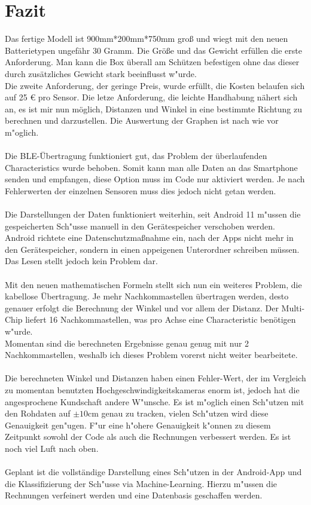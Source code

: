 \chapter{Fazit}
Das fertige Modell ist 900mm*200mm*750mm groß und wiegt mit den 
neuen Batterietypen ungefähr 30 Gramm. Die Größe und das Gewicht 
erfüllen die erste Anforderung. Man kann die Box überall am 
Schützen befestigen ohne das dieser durch zusätzliches Gewicht 
stark beeinflusst w"urde.\\
Die zweite Anforderung, der geringe Preis, wurde erfüllt, die
Kosten belaufen sich auf 25 \euro{} pro Sensor. Die letze Anforderung,
die leichte Handhabung nähert sich an, es ist mir nun möglich, Distanzen
und Winkel in eine bestimmte Richtung zu berechnen und darzustellen.
Die Auswertung der Graphen ist nach wie vor m"oglich.\\
\\
Die BLE-Übertragung funktioniert gut, das Problem der überlaufenden
Characteristics wurde behoben. Somit kann man alle Daten an das 
Smartphone senden und empfangen, diese Option muss im Code nur 
aktiviert werden. Je nach Fehlerwerten der einzelnen Sensoren muss dies 
jedoch nicht getan werden.\\
\\
Die Darstellungen der Daten funktioniert weiterhin, seit Android 11
m"ussen die gespeicherten Sch"usse manuell in den Gerätespeicher 
verschoben werden. Android richtete eine Datenschutzmaßnahme ein, 
nach der Apps nicht mehr in den Gerätespeicher, sondern in einen
appeigenen Unterordner schreiben müssen. Das Lesen stellt jedoch
kein Problem dar.\\
\\
Mit den neuen mathematischen Formeln stellt sich nun ein weiteres
Problem, die kabellose Übertragung. Je mehr Nachkommastellen übertragen
werden, desto genauer erfolgt die Berechnung der Winkel und vor allem 
der Distanz. Der Multi-Chip liefert 16 Nachkommastellen, was pro Achse
eine Characteristic benötigen w"urde.\\
Momentan sind die berechneten Ergebnisse genau genug mit nur 2 
Nachkommastellen, weshalb ich dieses Problem vorerst nicht weiter bearbeitete.\\
\\
Die berechneten Winkel und Distanzen haben einen Fehler-Wert, der im Vergleich
zu momentan benutzten Hochgeschwindigkeitskameras enorm ist, jedoch 
hat die angesprochene Kundschaft andere W"unsche. Es ist m"oglich 
einen Sch"utzen mit den Rohdaten auf $\pm10$cm genau zu tracken, vielen
Sch"utzen wird diese Genauigkeit gen"ugen. F"ur eine h"ohere Genauigkeit 
k"onnen zu diesem Zeitpunkt sowohl der Code als auch die Rechnungen verbessert 
werden. Es ist noch viel Luft nach oben.\\
\\
Geplant ist die vollständige Darstellung eines Sch"utzen in der Android-App
und die Klassifizierung der Sch"usse via Machine-Learning. Hierzu m"ussen
die Rechnungen verfeinert werden und eine Datenbasis geschaffen werden.